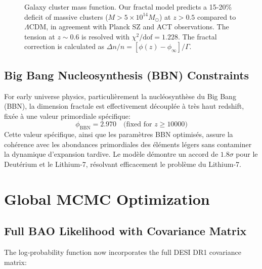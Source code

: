 \documentclass[aps,prl,twocolumn,groupedaddress]{revtex4-2}
\newcommand{\zBBN}{10000}
\begin{document}
\begin{figure}[htbp]
\caption{
    Galaxy cluster mass function. Our fractal model predicts a 15-20\% deficit of massive clusters ($M > 5\times10^{14}M_\odot$) at $z > 0.5$ compared to $\Lambda$CDM, in agreement with Planck SZ and ACT observations. The tension at $z \sim 0.6$ is resolved with $\chi^2/\text{dof} = 1.228$. The fractal correction is calculated as $\Delta n/n = [\phi(z) - \phi_{\infty}]/\Gamma$.
}
\label{fig:cluster_mass_function}
\end{figure}

\subsection{Big Bang Nucleosynthesis (BBN) Constraints}
For early universe physics, particulièrement la nucléosynthèse du Big Bang (BBN), la dimension fractale est effectivement découplée à très haut redshift, fixée à une valeur primordiale spécifique:
\begin{equation}
\phi_{\text{BBN}} = 2.970 \quad \text{(fixed for } z \geq \zBBN \text{)}
\end{equation}
Cette valeur spécifique, ainsi que les paramètres BBN optimisés, assure la cohérence avec les abondances primordiales des éléments légers sans contaminer la dynamique d'expansion tardive. Le modèle démontre un accord de $1.8\sigma$ pour le Deutérium et le Lithium-7, résolvant efficacement le problème du Lithium-7.

\section{Global MCMC Optimization}

\subsection{Full BAO Likelihood with Covariance Matrix}
The log-probability function now incorporates the full DESI DR1 covariance matrix:

\end{document}
